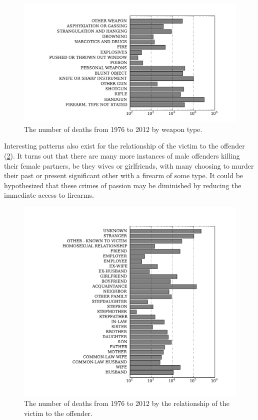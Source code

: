 \documentclass{evanarticle}
\begin{document}
\begin{figure}[H]
  \centering
    \includegraphics[width=1.0\linewidth]{images/weaps.pdf}
  \caption{The number of deaths from 1976 to 2012 by weapon type.}
  \label{fig_weaps}
\end{figure}

Interesting patterns also exist for the relationship of the victim to the offender (\cref{fig_relationship}).
It turns out that there are many more instances of male offenders killing their female partners, be they wives or girlfriends, with many choosing to murder their past or present significant other with a firearm of some type.
It could be hypothesized that these crimes of passion may be diminished by reducing the immediate access to firearms.

\begin{figure}[H]
  \centering
    \includegraphics[width=1.0\linewidth]{images/relationship.pdf}
  \caption{The number of deaths from 1976 to 2012 by the relationship of the victim to the offender.}
  \label{fig_relationship}
\end{figure}
\end{document}
